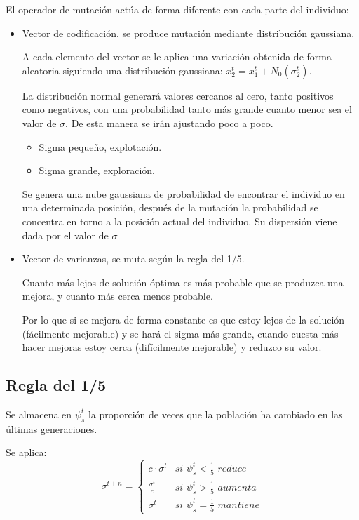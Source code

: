 \documentclass[12pt, twoside, openright]{report} %
\begin{document}
El operador de mutación actúa de forma diferente con cada parte del individuo:
\begin{itemize}
	\item Vector de codificación, se produce mutación mediante distribución gaussiana.
	
	A cada elemento del vector se le aplica una variación obtenida de forma aleatoria siguiendo una distribución gaussiana: $x^t_2=x^t_1+N_0(\sigma^t_2)$.

	La distribución normal generará valores cercanos al cero, tanto positivos como negativos, con una probabilidad tanto más grande cuanto menor sea el valor de $\sigma$. De esta manera se irán ajustando poco a poco.
	\begin{itemize}
		\item Sigma pequeño, explotación.
		\item Sigma grande, exploración.
	\end{itemize}

	Se genera una nube gaussiana de probabilidad de encontrar el individuo en una determinada posición, después de la mutación la probabilidad se concentra en torno a la posición actual del individuo. Su dispersión viene dada por el valor de $\sigma$

	\item Vector de varianzas, se muta según la regla del 1/5.
	
	Cuanto más lejos de solución óptima es más probable que se produzca una mejora, y cuanto más cerca menos probable.
	
	Por lo que si se mejora de forma constante es que estoy lejos de la solución (fácilmente mejorable) y se hará el sigma más grande, cuando cuesta más hacer mejoras estoy cerca (difícilmente mejorable) y reduzco su valor.
\end{itemize}

\subsection{Regla del 1/5}
Se almacena en $\psi^t_s$ la proporción de veces que la población ha cambiado en las últimas generaciones.

Se aplica:
$$\sigma^{t+n} = \begin{cases} 
	c \cdot \sigma^t & \textit{si }\psi^t_s < \frac{1}{5} \textit{ reduce}\\
	\frac{\sigma^t}{c} & \textit{si }\psi^t_s > \frac{1}{5} \textit{ aumenta}\\
	\sigma^t & \textit{si }\psi^t_s = \frac{1}{5}  \textit{ mantiene}
 \end{cases}$$
\end{document}
